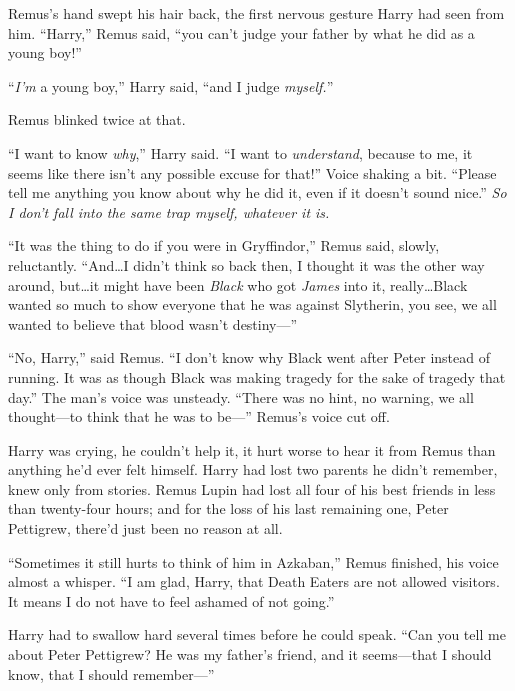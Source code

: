 Remus’s hand swept his hair back, the first nervous gesture Harry had seen from
him. “Harry,” Remus said, “you can’t judge your father by what he did as a
young boy!”

“\emph{I’m} a young boy,” Harry said, “and I judge \emph{myself.}”

Remus blinked twice at that.

“I want to know \emph{why},” Harry said. “I want to \emph{understand}, because
to me, it seems like there isn’t any possible excuse for that!” Voice shaking a
bit. “Please tell me anything you know about why he did it, even if it doesn’t
sound nice.”  \emph{So I don’t fall into the same trap myself, whatever it is.}

“It was the thing to do if you were in Gryffindor,” Remus said, slowly,
reluctantly. “And…I didn’t think so back then, I thought it was the
other way around, but…it might have been \emph{Black} who got
\emph{James} into it, really…Black wanted so much to show everyone that
he was against Slytherin, you see, we all wanted to believe that blood wasn’t
destiny—”

\later

“No, Harry,” said Remus. “I don’t know why Black went after Peter instead of
running. It was as though Black was making tragedy for the sake of tragedy that
day.” The man’s voice was unsteady. “There was no hint, no warning, we all
thought—to think that he was to be—” Remus’s voice cut off.

Harry was crying, he couldn’t help it, it hurt worse to hear it from Remus than
anything he’d ever felt himself. Harry had lost two parents he didn’t remember,
knew only from stories. Remus Lupin had lost all four of his best friends in
less than twenty-four hours; and for the loss of his last remaining one, Peter
Pettigrew, there’d just been no reason at all.

“Sometimes it still hurts to think of him in Azkaban,” Remus finished, his
voice almost a whisper. “I am glad, Harry, that Death Eaters are not allowed
visitors. It means I do not have to feel ashamed of not going.”

Harry had to swallow hard several times before he could speak. “Can you tell me
about Peter Pettigrew? He was my father’s friend, and it seems—that I should
know, that I should remember—”

